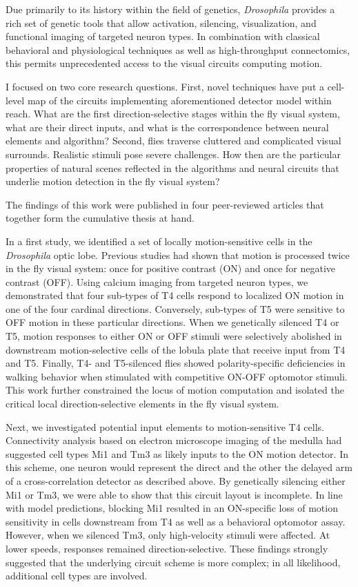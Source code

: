 Due primarily to its history within the field of genetics, \textit{Drosophila} provides a rich set of genetic tools that allow activation, silencing, visualization, and functional imaging of targeted neuron types. In combination with classical behavioral and physiological techniques as well as high-throughput connectomics, this permits unprecedented access to the visual circuits computing motion.

I focused on two core research questions. First, novel techniques have put a cell-level map of the circuits implementing aforementioned detector model within reach. What are the first direction-selective stages within the fly visual system, what are their direct inputs, and what is the correspondence between neural elements and algorithm? Second, flies traverse cluttered and complicated visual surrounds. Realistic stimuli pose severe challenges. How then are the particular properties of natural scenes reflected in the algorithms and neural circuits that underlie motion detection in the fly visual system?

The findings of this work were published in four peer-reviewed articles that together form the cumulative thesis at hand.

In a first study, we identified a set of locally motion-sensitive cells in the \textit{Drosophila} optic lobe. Previous studies had shown that motion is processed twice in the fly visual system: once for positive contrast (ON) and once for negative contrast (OFF). Using calcium imaging from targeted neuron types, we demonstrated that four sub-types of T4 cells respond to localized ON motion in one of the four cardinal directions. Conversely, sub-types of T5 were sensitive to OFF motion in these particular directions. When we genetically silenced T4 or T5, motion responses to either ON or OFF stimuli were selectively abolished in downstream motion-selective cells of the lobula plate that receive input from T4 and T5. Finally, T4- and T5-silenced flies showed polarity-specific deficiencies in walking behavior when stimulated with competitive ON-OFF optomotor stimuli. This work further constrained the locus of motion computation and isolated the critical local direction-selective elements in the fly visual system.

Next, we investigated potential input elements to motion-sensitive T4 cells. Connectivity analysis based on electron microscope imaging of the medulla had suggested cell types Mi1 and Tm3 as likely inputs to the ON motion detector. In this scheme, one neuron would represent the direct and the other the delayed arm of a cross-correlation detector as described above. By genetically silencing either Mi1 or Tm3, we were able to show that this circuit layout is incomplete. In line with model predictions, blocking Mi1 resulted in an ON-specific loss of motion sensitivity in cells downstream from T4 as well as a behavioral optomotor assay. However, when we silenced Tm3, only high-velocity stimuli were affected. At lower speeds, responses remained direction-selective. These findings strongly suggested that the underlying circuit scheme is more complex; in all likelihood, additional cell types are involved.

